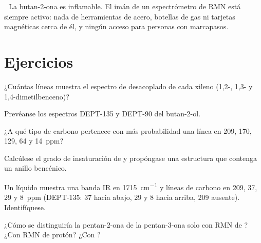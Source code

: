 \begin{safety}{\,\,}
La butan-2-ona es inflamable. El imán de un espectrómetro de RMN está siempre activo: nada de herramientas de acero, botellas de
gas ni tarjetas magnéticas cerca de él, y ningún acceso para personas con marcapasos.
\end{safety}

\section{Ejercicios}

\begin{exercise}[$\star$]\label{exo:b2:structure-determination:1}
¿Cuántas líneas muestra el espectro de  desacoplado de cada xileno (1,2-, 1,3- y
1,4-dimetilbenceno)?
\end{exercise}

\begin{exercise}[$\star$]\label{exo:b2:structure-determination:2}
Prevéanse los espectros DEPT-135 y DEPT-90 del butan-2-ol.
\end{exercise}

\begin{exercise}[$\star$]\label{exo:b2:structure-determination:3}
¿A qué tipo de carbono pertenece con más probabilidad una línea en 209, 170, 129, 64 y 14~ppm?
\end{exercise}

\begin{exercise}[$\star$]\label{exo:b2:structure-determination:4}
Calcúlese el grado de insaturación de  y propóngase una estructura que contenga un anillo bencénico.
\end{exercise}

\begin{exercise}[$\star\star$]\label{exo:b2:structure-determination:5}
Un líquido  muestra una banda IR en \qty{1715}{cm^{-1}} y líneas de carbono en 209, 37, 29 y 8~ppm
(DEPT-135: 37 hacia abajo, 29 y 8 hacia arriba, 209 ausente). Identifíquese.
\end{exercise}

\begin{exercise}[$\star\star$]\label{exo:b2:structure-determination:6}
¿Cómo se distinguiría la pentan-2-ona de la pentan-3-ona solo con RMN de ? ¿Con RMN de protón? ¿Con
?
\end{exercise}

